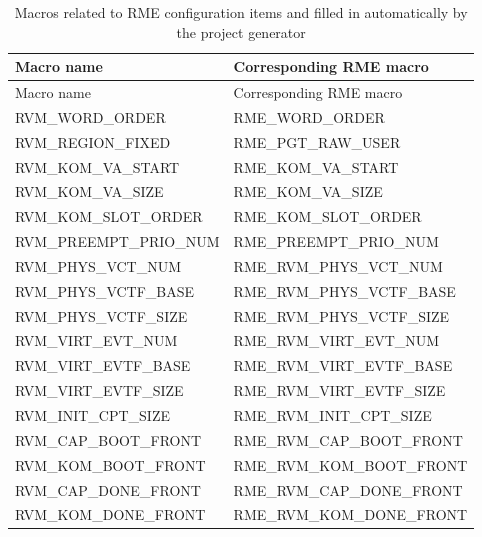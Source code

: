 \begin{xltabular}{\textwidth}{@{}>{\hsize\raggedright\arraybackslash}X>{\hsize\raggedright\arraybackslash}X@{}}
\caption{Macros related to RME configuration items and filled in automatically by the project generator}\label{tab:8-3}\\
\toprule
Macro name & Corresponding RME macro\tabularnewline
\endfirsthead
\toprule
Macro name & Corresponding RME macro\tabularnewline
\midrule
\endhead
\bottomrule
\endlastfoot
RVM\_\allowbreak{}WORD\_\allowbreak{}ORDER & RME\_\allowbreak{}WORD\_\allowbreak{}ORDER\tabularnewline
RVM\_\allowbreak{}REGION\_\allowbreak{}FIXED & RME\_\allowbreak{}PGT\_\allowbreak{}RAW\_\allowbreak{}USER\tabularnewline
RVM\_\allowbreak{}KOM\_\allowbreak{}VA\_\allowbreak{}START & RME\_\allowbreak{}KOM\_\allowbreak{}VA\_\allowbreak{}START\tabularnewline
RVM\_\allowbreak{}KOM\_\allowbreak{}VA\_\allowbreak{}SIZE & RME\_\allowbreak{}KOM\_\allowbreak{}VA\_\allowbreak{}SIZE\tabularnewline
RVM\_\allowbreak{}KOM\_\allowbreak{}SLOT\_\allowbreak{}ORDER & RME\_\allowbreak{}KOM\_\allowbreak{}SLOT\_\allowbreak{}ORDER\tabularnewline
RVM\_\allowbreak{}PREEMPT\_\allowbreak{}PRIO\_\allowbreak{}NUM & RME\_\allowbreak{}PREEMPT\_\allowbreak{}PRIO\_\allowbreak{}NUM\tabularnewline
RVM\_\allowbreak{}PHYS\_\allowbreak{}VCT\_\allowbreak{}NUM & RME\_\allowbreak{}RVM\_\allowbreak{}PHYS\_\allowbreak{}VCT\_\allowbreak{}NUM\tabularnewline
RVM\_\allowbreak{}PHYS\_\allowbreak{}VCTF\_\allowbreak{}BASE & RME\_\allowbreak{}RVM\_\allowbreak{}PHYS\_\allowbreak{}VCTF\_\allowbreak{}BASE\tabularnewline
RVM\_\allowbreak{}PHYS\_\allowbreak{}VCTF\_\allowbreak{}SIZE & RME\_\allowbreak{}RVM\_\allowbreak{}PHYS\_\allowbreak{}VCTF\_\allowbreak{}SIZE\tabularnewline
RVM\_\allowbreak{}VIRT\_\allowbreak{}EVT\_\allowbreak{}NUM & RME\_\allowbreak{}RVM\_\allowbreak{}VIRT\_\allowbreak{}EVT\_\allowbreak{}NUM\tabularnewline
RVM\_\allowbreak{}VIRT\_\allowbreak{}EVTF\_\allowbreak{}BASE & RME\_\allowbreak{}RVM\_\allowbreak{}VIRT\_\allowbreak{}EVTF\_\allowbreak{}BASE\tabularnewline
RVM\_\allowbreak{}VIRT\_\allowbreak{}EVTF\_\allowbreak{}SIZE & RME\_\allowbreak{}RVM\_\allowbreak{}VIRT\_\allowbreak{}EVTF\_\allowbreak{}SIZE\tabularnewline
RVM\_\allowbreak{}INIT\_\allowbreak{}CPT\_\allowbreak{}SIZE & RME\_\allowbreak{}RVM\_\allowbreak{}INIT\_\allowbreak{}CPT\_\allowbreak{}SIZE\tabularnewline
RVM\_\allowbreak{}CAP\_\allowbreak{}BOOT\_\allowbreak{}FRONT & RME\_\allowbreak{}RVM\_\allowbreak{}CAP\_\allowbreak{}BOOT\_\allowbreak{}FRONT\tabularnewline
RVM\_\allowbreak{}KOM\_\allowbreak{}BOOT\_\allowbreak{}FRONT & RME\_\allowbreak{}RVM\_\allowbreak{}KOM\_\allowbreak{}BOOT\_\allowbreak{}FRONT\tabularnewline
RVM\_\allowbreak{}CAP\_\allowbreak{}DONE\_\allowbreak{}FRONT & RME\_\allowbreak{}RVM\_\allowbreak{}CAP\_\allowbreak{}DONE\_\allowbreak{}FRONT\tabularnewline
RVM\_\allowbreak{}KOM\_\allowbreak{}DONE\_\allowbreak{}FRONT & RME\_\allowbreak{}RVM\_\allowbreak{}KOM\_\allowbreak{}DONE\_\allowbreak{}FRONT\tabularnewline
\end{xltabular}

